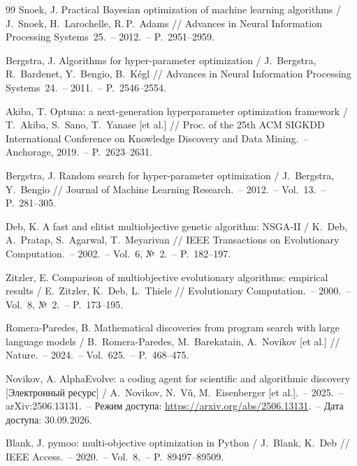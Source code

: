 \begin{thebibliography}{99}
Snoek, J. Practical Bayesian optimization of machine learning algorithms / J.~Snoek, H.~Larochelle,
R.\,P.~Adams // Advances in Neural Information Processing Systems~25.~-- 2012.~-- P.~2951--2959.

Bergstra, J. Algorithms for hyper-parameter optimization / J.~Bergstra, R.~Bardenet, Y.~Bengio,
B.~Kégl // Advances in Neural Information Processing Systems~24.~-- 2011.~-- P.~2546--2554.

Akiba, T. Optuna: a next-generation hyperparameter optimization framework / T.~Akiba, S.~Sano,
T.~Yanase [et al.] // Proc. of the 25th ACM SIGKDD International Conference on Knowledge Discovery and
Data Mining.~-- Anchorage, 2019.~-- P.~2623--2631.

Bergstra, J. Random search for hyper-parameter optimization / J.~Bergstra, Y.~Bengio // Journal of
Machine Learning Research.~-- 2012.~-- Vol.~13.~-- P.~281--305.

Deb, K. A fast and elitist multiobjective genetic algorithm: NSGA-II / K.~Deb, A.~Pratap, S.~Agarwal,
T.~Meyarivan // IEEE Transactions on Evolutionary Computation.~-- 2002.~-- Vol.~6, №~2.~-- P.~182--197.

Zitzler, E. Comparison of multiobjective evolutionary algorithms: empirical results / E.~Zitzler,
K.~Deb, L.~Thiele // Evolutionary Computation.~-- 2000.~-- Vol.~8, №~2.~-- P.~173--195.

Romera-Paredes, B. Mathematical discoveries from program search with large language models /
B.~Romera-Paredes, M.~Barekatain, A.~Novikov [et al.] // Nature.~-- 2024.~-- Vol.~625.~-- P.~468--475.

Novikov, A. AlphaEvolve: a coding agent for scientific and algorithmic discovery [Электронный ресурс] /
A.~Novikov, N.~V\~{u}, M.~Eisenberger [et al.].~-- 2025.~-- arXiv:2506.13131.~-- Режим доступа:
\url{https://arxiv.org/abs/2506.13131}.~-- Дата доступа: 30.09.2026.

Blank, J. pymoo: multi-objective optimization in Python / J.~Blank, K.~Deb // IEEE Access.~-- 2020.~--
Vol.~8.~-- P.~89497--89509.

\end{thebibliography}
